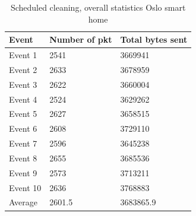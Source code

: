 \begin{table}[H]
\centering
\caption{Scheduled cleaning, overall statistics Oslo smart home}
\label{tab:scoverall}
\begin{tabular}{|l|l|l|}
\hline
\textbf{Event} & \textbf{Number of pkt} & \textbf{Total bytes sent} \\ \hline
Event 1        & 2541                   & 3669941                   \\ \hline
Event 2        & 2633                   & 3678959                   \\ \hline
Event 3        & 2622                   & 3660004                   \\ \hline
Event 4        & 2524                   & 3629262                   \\ \hline
Event 5        & 2627                   & 3658515                   \\ \hline
Event 6        & 2608                   & 3729110                   \\ \hline
Event 7        & 2596                   & 3645238                   \\ \hline
Event 8        & 2655                   & 3685536                   \\ \hline
Event 9        & 2573                   & 3713211                   \\ \hline
Event 10       & 2636                   & 3768883                   \\ \hline
Average        & 2601.5                 & 3683865.9                 \\ \hline
\end{tabular}
\end{table}

